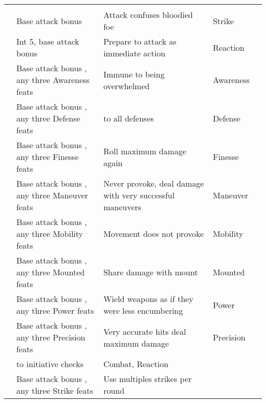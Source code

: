 {\begin{longtabu}{>{\lcol}p{10em} >{\lcol}p{15em} >{\lcol}X >{\lcol}p{6em} >{\lcol}p{3em}}
        \midrule
         &  &  &  &  \\
         & Base attack bonus  & Attack confuses bloodied foe & Strike &  \\
         & Int 5, base attack bonus  & Prepare to attack as immediate action & Reaction &  \\
         & Base attack bonus , any three Awareness feats & Immune to being overwhelmed & Awareness &  \\
         & Base attack bonus , any three Defense feats &  to all defenses & Defense &  \\
         & Base attack bonus , any three Finesse feats & Roll maximum damage again & Finesse &  \\
         & Base attack bonus , any three Maneuver feats & Never provoke, deal damage with very successful maneuvers & Maneuver &  \\
         & Base attack bonus , any three Mobility feats & Movement does not provoke & Mobility&  \\
         & Base attack bonus , any three Mounted feats & Share damage with mount & Mounted&  \\
         & Base attack bonus , any three Power feats & Wield weapons as if they were less encumbering & Power&  \\
         & Base attack bonus , any three Precision feats & Very accurate hits deal maximum damage & Precision &  \\
         &  to initiative checks & Combat, Reaction &  \\
         & Base attack bonus , any three Strike feats & Use multiples strikes per round & \x &  \\

\end{longtabu}}
